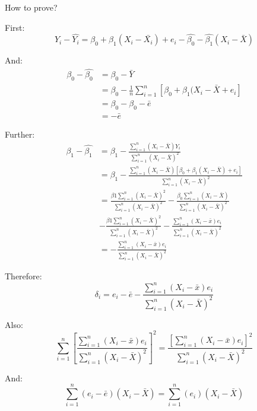\documentclass{article}
\begin{document}
How to prove?

First:
\begin{equation}
    Y_i-\hat{Y_i}=\beta_0+\beta_1(X_i-\bar{X_i})+e_i-\hat{\beta_0}-\hat{\beta_1}(X_i-\bar{X})
\end{equation}

And:
\begin{equation}
    \begin{split}
    \beta_0-\hat{\beta_0}&=\beta_0-\bar{Y}\\
    &=\beta_0-\frac{1}{n}\sum_{i=1}^n[\beta_0+\beta_1(X_i-\bar{X}+e_i]\\
    &=\beta_0-\beta_0-\bar{e}\\
    &=-\bar{e}
    \end{split}
\end{equation}

Further:
\begin{equation}
    \begin{split}
    \beta_1-\hat{\beta_1}&=\beta_1-\frac{\sum_{i=1}^n(X_i-\bar{X})Y_i}{\sum_{i=1}^n(X_i-\bar{X})^2}\\
    &=\beta_1-\frac{\sum_{i=1}^n(X_i-\bar{X})[\beta_0+\beta_1(X_i-\bar{X})+e_i]}{\sum_{i=1}^n(X_i-\bar{X})^2}\\
    &=\frac{\beta{1}\sum_{i=1}^n(X_i-\bar{X})^2}{\sum_{i=1}^n(X_i-\bar{X})^2}-\frac{\beta_0\sum_{i=1}^n(X_i-\bar{X})}{\sum_{i=1}^n(X_i-\bar{X})^2}\\
    &-\frac{\beta{1}\sum_{i=1}^n(X_i-\bar{X})^2}{\sum_{i=1}^n(X_i-\bar{X})^2}-\frac{\sum_{i=1}^n(X_i-\bar{x})e_i}{\sum_{i=1}^n(X_i-\bar{X})^2}\\
    &=-\frac{\sum_{i=1}^n(X_i-\bar{x})e_i}{\sum_{i=1}^n(X_i-\bar{X})^2}
    \end{split}
\end{equation}

Therefore:
\begin{equation}
\delta_i=e_i-\bar{e}-\frac{\sum_{i=1}^n(X_i-\bar{x})e_i}{\sum_{i=1}^n(X_i-\bar{X})^2}
\end{equation}

Also:
\begin{equation}
\sum_{i=1}^n[\frac{\sum_{i=1}^n(X_i-\bar{x})e_i}{\sum_{i=1}^n(X_i-\bar{X})^2}]^2=
\frac{[\sum_{i=1}^n(X_i-\bar{x})e_i]^2}{\sum_{i=1}^n(X_i-\bar{X})^2}
\end{equation}

And:
\begin{equation}
\sum_{i=1}^n(e_i-\bar{e})(X_i-\bar{X})=\sum_{i=1}^n(e_i)(X_i-\bar{X})
\end{equation}
\end{document}

